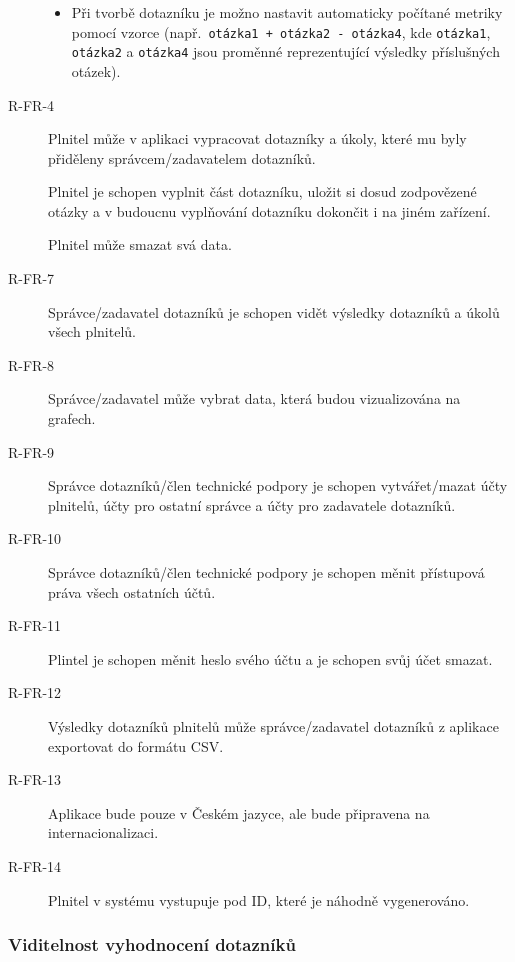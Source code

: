 \begin{description}
    \begin{itemize}
        \item
        Při tvorbě dotazníku je možno nastavit automaticky počítané metriky pomocí vzorce (např.\ \texttt{otázka1\ +\ otázka2\ -\ otázka4}, kde \texttt{otázka1}, \texttt{otázka2} a \texttt{otázka4} jsou proměnné reprezentující výsledky příslušných otázek).
    \end{itemize}
    \item[R-FR-4]
    Plnitel může v aplikaci vypracovat dotazníky a úkoly, které mu byly přiděleny správcem/zadavatelem dotazníků.
    \item[\namedlabel{itm:r-fr-5}{R-FR-5}]
    Plnitel je schopen vyplnit část dotazníku, uložit si dosud zodpovězené otázky a v budoucnu vyplňování dotazníku dokončit i na jiném zařízení.
    \item[\namedlabel{itm:r-fr-6}{R-FR-6}]
    Plnitel může smazat svá data.
    \item[R-FR-7]
    Správce/zadavatel dotazníků je schopen vidět výsledky dotazníků a úkolů všech plnitelů.
    \item[R-FR-8]
    Správce/zadavatel může vybrat data, která budou vizualizována na grafech.
    \item[R-FR-9]
    Správce dotazníků/člen technické podpory je schopen vytvářet/mazat účty plnitelů, účty pro ostatní správce a účty pro zadavatele dotazníků.
    \item[R-FR-10]
    Správce dotazníků/člen technické podpory je schopen měnit přístupová práva všech ostatních účtů.
    \item[R-FR-11]
    Plintel je schopen měnit heslo svého účtu a je schopen svůj účet smazat.
    \item[R-FR-12]
    Výsledky dotazníků plnitelů může správce/zadavatel dotazníků z aplikace exportovat do formátu CSV\@.
    \item[R-FR-13]
    Aplikace bude pouze v Českém jazyce, ale bude připravena na internacionalizaci.
    \item[R-FR-14]
    Plnitel v systému vystupuje pod ID, které je náhodně vygenerováno.
\end{description}

\subsubsection{Viditelnost vyhodnocení dotazníků}\label{subsubsec:viditelnost-vyhodnoceni-dotazniku}

